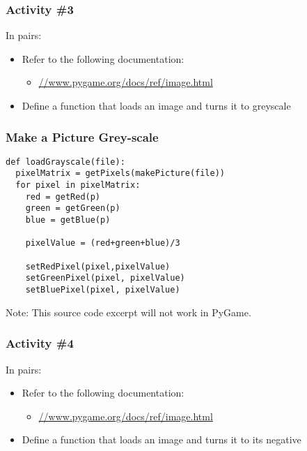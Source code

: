 \begin{frame}
	\frametitle{Activity \#3}
	
	In pairs:
	
	\vspace{2em}
	
	\begin{itemize}
		\item Refer to the following documentation:
		\begin{itemize}
			\item \url{//www.pygame.org/docs/ref/image.html}
		\end{itemize}
		\item Define a function that loads an image and turns it to greyscale
	\end{itemize}
\end{frame}

\begin{frame}[fragile]
	\frametitle{Make a Picture Grey-scale}
	
\begin{lstlisting}
def loadGrayscale(file):
  pixelMatrix = getPixels(makePicture(file))
  for pixel in pixelMatrix:
    red = getRed(p)
    green = getGreen(p)
    blue = getBlue(p)
    
    pixelValue = (red+green+blue)/3
    
    setRedPixel(pixel,pixelValue)
    setGreenPixel(pixel, pixelValue)
    setBluePixel(pixel, pixelValue)
\end{lstlisting}

Note: This source code excerpt will not work in PyGame.

\end{frame}

\begin{frame}
	\frametitle{Activity \#4}
	
	In pairs:
	
	\vspace{2em}
	
	\begin{itemize}
		\item Refer to the following documentation:
		\begin{itemize}
			\item \url{//www.pygame.org/docs/ref/image.html}
		\end{itemize}
		\item Define a function that loads an image and turns it to its negative
	\end{itemize}
\end{frame}

